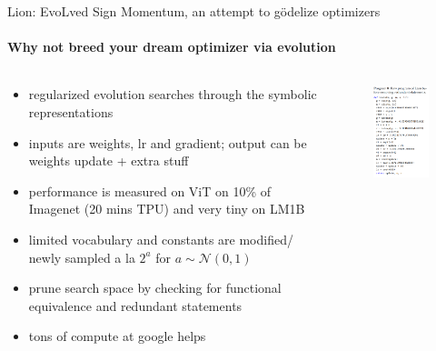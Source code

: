 \documentclass[
	11pt, %
	aspectratio=169, %
]{beamer}
\begin{document}
\begin{frame}{Lion: EvoLved Sign Momentum, an attempt to gödelize optimizers }
	\framesubtitle{Why not breed your dream optimizer via evolution }
	\vspace{-1em}
\begin{columns}[c] %
		\begin{column}{0.45\textwidth} %
			\begin{itemize}
					\item regularized evolution searches through the symbolic representations					
					\item inputs are weights, lr and gradient; output can be weights update + extra stuff
					\item performance is measured on ViT on 10\% of Imagenet (20 mins TPU) and very tiny on LM1B
					\item limited vocabulary and constants are modified/ newly sampled a la $2^a$ for $a\sim \mathcal{N}(0,1)$
					\item prune search space by checking for functional equivalence and redundant statements 
					\item tons of compute at google helps
			\end{itemize}
		\end{column}
		\begin{column}{0.55\textwidth} %
        	\begin{figure}
        	    \centering
                \includegraphics[width=4.4cm]{figures/raw_lion.png}
        	\end{figure}
		\end{column}
	\end{columns}
\end{frame}
\end{document}
